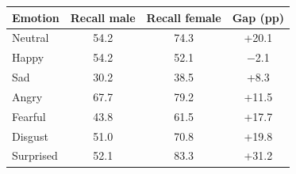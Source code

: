 \begin{tabular}{lccc}
\toprule
Emotion & Recall male & Recall female & Gap (pp) \\
\midrule
Neutral & 54.2 & 74.3 & +20.1 \\
Happy & 54.2 & 52.1 & $-$2.1 \\
Sad & 30.2 & 38.5 & +8.3 \\
Angry & 67.7 & 79.2 & +11.5 \\
Fearful & 43.8 & 61.5 & +17.7 \\
Disgust & 51.0 & 70.8 & +19.8 \\
Surprised & 52.1 & 83.3 & +31.2 \\
\bottomrule
\end{tabular}
